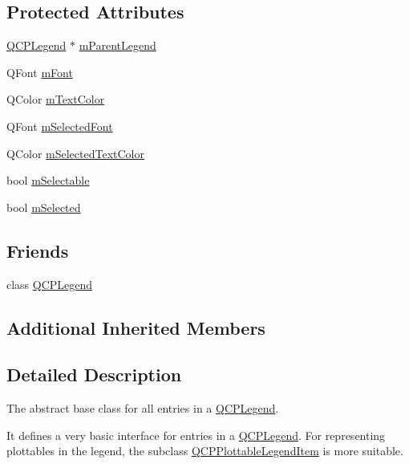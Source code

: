 \subsection*{Protected Attributes}
\begin{DoxyCompactItemize}
\item 
\hyperlink{class_q_c_p_legend}{Q\+C\+P\+Legend} $\ast$ \hyperlink{class_q_c_p_abstract_legend_item_aafcd9fc6fcb10f4a8d46037011afafe8}{m\+Parent\+Legend}
\item 
Q\+Font \hyperlink{class_q_c_p_abstract_legend_item_ae916a78ac0d2a60e20a17ca2f24f9754}{m\+Font}
\item 
Q\+Color \hyperlink{class_q_c_p_abstract_legend_item_a974b21e9930227d281344bd2242d289d}{m\+Text\+Color}
\item 
Q\+Font \hyperlink{class_q_c_p_abstract_legend_item_ab971df604306b192875a7d097feb1e21}{m\+Selected\+Font}
\item 
Q\+Color \hyperlink{class_q_c_p_abstract_legend_item_a4965c13854d970b24c284f0a4f005fbd}{m\+Selected\+Text\+Color}
\item 
bool \hyperlink{class_q_c_p_abstract_legend_item_aa84029f57b1b32f642fb7db63c3fc2c2}{m\+Selectable}
\item 
bool \hyperlink{class_q_c_p_abstract_legend_item_ae58ebebbd0c36cc6fe897483369984d2}{m\+Selected}
\end{DoxyCompactItemize}
\subsection*{Friends}
\begin{DoxyCompactItemize}
\item 
class \hyperlink{class_q_c_p_abstract_legend_item_a8429035e7adfbd7f05805a6530ad5e3b}{Q\+C\+P\+Legend}
\end{DoxyCompactItemize}
\subsection*{Additional Inherited Members}


\subsection{Detailed Description}
The abstract base class for all entries in a \hyperlink{class_q_c_p_legend}{Q\+C\+P\+Legend}. 

It defines a very basic interface for entries in a \hyperlink{class_q_c_p_legend}{Q\+C\+P\+Legend}. For representing plottables in the legend, the subclass \hyperlink{class_q_c_p_plottable_legend_item}{Q\+C\+P\+Plottable\+Legend\+Item} is more suitable.

